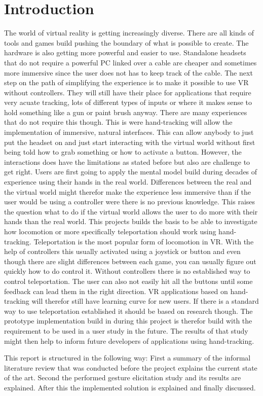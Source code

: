 
\chapter{Introduction}
The world of virtual reality is getting increasingly diverse. There are all kinds of tools and games build pushing the boundary of what is possible to create. The hardware is also getting more powerful and easier to use. Standalone headsets that do not require a powerful PC linked over a cable are cheaper and sometimes more immersive since the user does not has to keep track of the cable. The next step on the path of simplifying the experience is to make it possible to use VR without controllers. They will still have their place for applications that require very acuate tracking, lots of different types of inputs or where it makes sense to hold something like a gun or paint brush anyway. There are many experiences that do not require this though. This is were hand-tracking will allow the implementation of immersive, natural interfaces. This can allow anybody to just put the headset on and just start interacting with the virtual world without first being told how to grab something or how to activate a button. However, the interactions does have the limitations as stated before but also are challenge to get right. Users are first going to apply the mental model build during decades of experience using their hands in the real world. Differences between the real and the virtual world might therefor make the experience less immersive than if the user would be using a controller were there is no previous knowledge. This raises the question what to do if the virtual world allows the user to do more with their hands than the real world. This projects builds the basis to be able to investigate how locomotion or more specifically teleportation should work using hand-tracking. Teleportation is the most popular form of locomotion in VR. With the help of controllers this usually activated using a joystick or button and even though there are slight differences between each game, you can usually figure out quickly how to do control it. Without controllers there is no established way to control teleportation. The user can also not easily hit all the buttons until some feedback can lead them in the right direction. VR applications based on hand-tracking will therefor still have learning curve for new users. If there is a standard way to use teleportation established it should be based on research though. The prototype implementation build in during this project is therefor build with the requirement to be used in a user study in the future. The results of that study might then help to inform future developers of applications using hand-tracking.


This report is structured in the following way: First a summary of the informal literature review that was conducted before the project explains the current state of the art. Second the performed gesture elicitation study and its results are explained. After this the implemented solution is explained and finally discussed.





